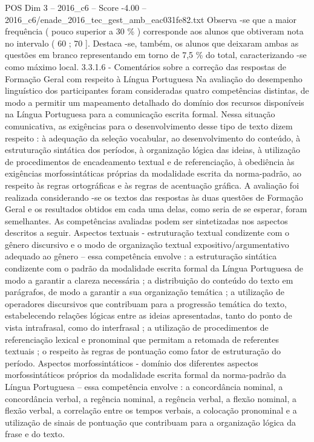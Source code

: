 \begin{textsample}{POS Dim 3 – 2016\_c6 – Score -4.00 – 2016\_c6/enade\_2016\_tec\_gest\_amb\_eac031fe82.txt}
Observa -se que a maior frequência ( pouco superior a 30 \% ) corresponde aos alunos que obtiveram nota no intervalo ( 60 ; 70 ].
Destaca -se, também, os alunos que deixaram ambas as questões em branco representando em torno de 7,5 \% do total, caracterizando -se como máximo local. 3.3.1.6 - Comentários sobre a correção das respostas de Formação Geral com respeito à Língua Portuguesa Na avaliação do desempenho linguístico dos participantes foram consideradas quatro competências distintas, de modo a permitir um mapeamento detalhado do domínio dos recursos disponíveis na Língua Portuguesa para a comunicação escrita formal.
Nessa situação comunicativa, as exigências para o desenvolvimento desse tipo de texto dizem respeito : à adequação da seleção vocabular, ao desenvolvimento do conteúdo, à estruturação sintática dos períodos, à organização lógica das ideias, à utilização de procedimentos de encadeamento textual e de referenciação, à obediência às exigências morfossintáticas próprias da modalidade escrita da norma-padrão, ao respeito às regras ortográficas e às regras de acentuação gráfica.
A avaliação foi realizada considerando -se os textos das respostas às duas questões de Formação Geral e os resultados obtidos em cada uma delas, como seria de se esperar, foram semelhantes.
As competências avaliadas podem ser sintetizadas nos aspectos descritos a seguir.
Aspectos textuais - estruturação textual condizente com o gênero discursivo e o modo de organização textual expositivo/argumentativo adequado ao gênero – essa competência envolve : a estruturação sintática condizente com o padrão da modalidade escrita formal da Língua Portuguesa de modo a garantir a clareza necessária ; a distribuição do conteúdo do texto em parágrafos, de modo a garantir a sua organização temática ; a utilização de operadores discursivos que contribuam para a progressão temática do texto, estabelecendo relações lógicas entre as ideias apresentadas, tanto do ponto de vista intrafrasal, como do interfrasal ; a utilização de procedimentos de referenciação lexical e pronominal que permitam a retomada de referentes textuais ; o respeito às regras de pontuação como fator de estruturação do período.
Aspectos morfossintáticos - domínio dos diferentes aspectos morfossintáticos próprios da modalidade escrita formal da norma-padrão da Língua Portuguesa – essa competência envolve : a concordância nominal, a concordância verbal, a regência nominal, a regência verbal, a flexão nominal, a flexão verbal, a correlação entre os tempos verbais, a colocação pronominal e a utilização de sinais de pontuação que contribuam para a organização lógica da frase e do texto.

\end{textsample}
